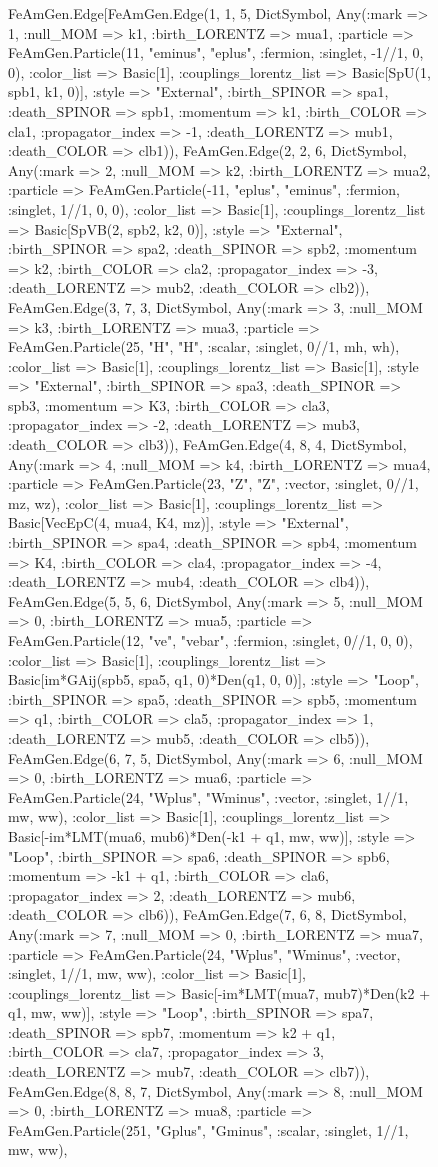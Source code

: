 \documentclass{revtex4}
\begin{document}
\begin{figure}[!htb]
\begin{center}
{FeAmGen.Edge[FeAmGen.Edge(1, 1, 5, Dict{Symbol, Any}(:mark => 1, :null_MOM => k1, :birth_LORENTZ => mua1, :particle => FeAmGen.Particle(11, "eminus", "eplus", :fermion, :singlet, -1//1, 0, 0), :color_list => Basic[1], :couplings_lorentz_list => Basic[SpU(1, spb1, k1, 0)], :style => "External", :birth_SPINOR => spa1, :death_SPINOR => spb1, :momentum => k1, :birth_COLOR => cla1, :propagator_index => -1, :death_LORENTZ => mub1, :death_COLOR => clb1)), FeAmGen.Edge(2, 2, 6, Dict{Symbol, Any}(:mark => 2, :null_MOM => k2, :birth_LORENTZ => mua2, :particle => FeAmGen.Particle(-11, "eplus", "eminus", :fermion, :singlet, 1//1, 0, 0), :color_list => Basic[1], :couplings_lorentz_list => Basic[SpVB(2, spb2, k2, 0)], :style => "External", :birth_SPINOR => spa2, :death_SPINOR => spb2, :momentum => k2, :birth_COLOR => cla2, :propagator_index => -3, :death_LORENTZ => mub2, :death_COLOR => clb2)), FeAmGen.Edge(3, 7, 3, Dict{Symbol, Any}(:mark => 3, :null_MOM => k3, :birth_LORENTZ => mua3, :particle => FeAmGen.Particle(25, "H", "H", :scalar, :singlet, 0//1, mh, wh), :color_list => Basic[1], :couplings_lorentz_list => Basic[1], :style => "External", :birth_SPINOR => spa3, :death_SPINOR => spb3, :momentum => K3, :birth_COLOR => cla3, :propagator_index => -2, :death_LORENTZ => mub3, :death_COLOR => clb3)), FeAmGen.Edge(4, 8, 4, Dict{Symbol, Any}(:mark => 4, :null_MOM => k4, :birth_LORENTZ => mua4, :particle => FeAmGen.Particle(23, "Z", "Z", :vector, :singlet, 0//1, mz, wz), :color_list => Basic[1], :couplings_lorentz_list => Basic[VecEpC(4, mua4, K4, mz)], :style => "External", :birth_SPINOR => spa4, :death_SPINOR => spb4, :momentum => K4, :birth_COLOR => cla4, :propagator_index => -4, :death_LORENTZ => mub4, :death_COLOR => clb4)), FeAmGen.Edge(5, 5, 6, Dict{Symbol, Any}(:mark => 5, :null_MOM => 0, :birth_LORENTZ => mua5, :particle => FeAmGen.Particle(12, "ve", "vebar", :fermion, :singlet, 0//1, 0, 0), :color_list => Basic[1], :couplings_lorentz_list => Basic[im*GAij(spb5, spa5, q1, 0)*Den(q1, 0, 0)], :style => "Loop", :birth_SPINOR => spa5, :death_SPINOR => spb5, :momentum => q1, :birth_COLOR => cla5, :propagator_index => 1, :death_LORENTZ => mub5, :death_COLOR => clb5)), FeAmGen.Edge(6, 7, 5, Dict{Symbol, Any}(:mark => 6, :null_MOM => 0, :birth_LORENTZ => mua6, :particle => FeAmGen.Particle(24, "Wplus", "Wminus", :vector, :singlet, 1//1, mw, ww), :color_list => Basic[1], :couplings_lorentz_list => Basic[-im*LMT(mua6, mub6)*Den(-k1 + q1, mw, ww)], :style => "Loop", :birth_SPINOR => spa6, :death_SPINOR => spb6, :momentum => -k1 + q1, :birth_COLOR => cla6, :propagator_index => 2, :death_LORENTZ => mub6, :death_COLOR => clb6)), FeAmGen.Edge(7, 6, 8, Dict{Symbol, Any}(:mark => 7, :null_MOM => 0, :birth_LORENTZ => mua7, :particle => FeAmGen.Particle(24, "Wplus", "Wminus", :vector, :singlet, 1//1, mw, ww), :color_list => Basic[1], :couplings_lorentz_list => Basic[-im*LMT(mua7, mub7)*Den(k2 + q1, mw, ww)], :style => "Loop", :birth_SPINOR => spa7, :death_SPINOR => spb7, :momentum => k2 + q1, :birth_COLOR => cla7, :propagator_index => 3, :death_LORENTZ => mub7, :death_COLOR => clb7)), FeAmGen.Edge(8, 8, 7, Dict{Symbol, Any}(:mark => 8, :null_MOM => 0, :birth_LORENTZ => mua8, :particle => FeAmGen.Particle(251, "Gplus", "Gminus", :scalar, :singlet, 1//1, mw, ww), }
\end{center}
\end{figure}
\end{document}
